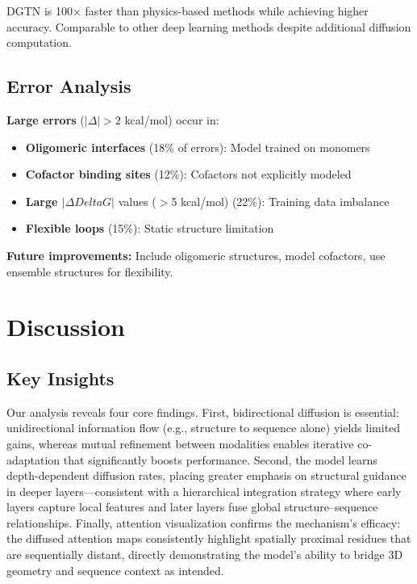 \documentclass[11pt]{article}
\begin{document}
DGTN is 100× faster than physics-based methods while achieving higher accuracy. Comparable to other deep learning methods despite additional diffusion computation.

\subsection{Error Analysis}

\textbf{Large errors} ($|\Delta| > 2$ kcal/mol) occur in:
\begin{itemize}
    \item \textbf{Oligomeric interfaces} (18\% of errors): Model trained on monomers
    \item \textbf{Cofactor binding sites} (12\%): Cofactors not explicitly modeled
    \item \textbf{Large $|\Delta Delta G|$} values ($>$5 kcal/mol) (22\%): Training data imbalance
    \item \textbf{Flexible loops} (15\%): Static structure limitation
\end{itemize}

\textbf{Future improvements:} Include oligomeric structures, model cofactors, use ensemble structures for flexibility.



\section{Discussion}
\subsection*{Key Insights}

Our analysis reveals four core findings. First, bidirectional diffusion is
essential: unidirectional information flow (e.g., structure to sequence alone)
yields limited gains, whereas mutual refinement between modalities enables
iterative co-adaptation that significantly boosts performance. Second, the
model learns depth-dependent diffusion rates, placing greater emphasis on
structural guidance in deeper layers—consistent with a hierarchical integration
strategy where early layers capture local features and later layers fuse global
structure–sequence relationships. 
Finally,
attention visualization confirms the mechanism’s efficacy: the diffused
attention maps consistently highlight spatially proximal residues that are
sequentially distant, directly demonstrating the model’s ability to bridge 3D
geometry and sequence context as intended.
\end{document}
